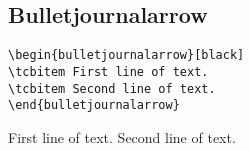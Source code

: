 \subsection{Bulletjournalarrow}

\lipsum[1][1-3]
\begin{highlightbox}
\begin{verbatim}
\begin{bulletjournalarrow}[black]
\tcbitem First line of text.
\tcbitem Second line of text.
\end{bulletjournalarrow}
\end{verbatim}
\end{highlightbox}
\begin{bulletjournalarrow}[black]
\tcbitem First line of text.
\tcbitem Second line of text.
\end{bulletjournalarrow}



